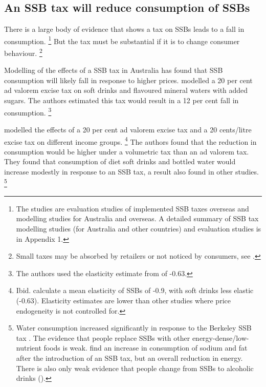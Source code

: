 \documentclass[embargoed]{grattan}
\begin{document}
\subsection{An SSB tax will reduce consumption of SSBs}\label{an-ssb-tax-will-reduce-consumption-of-ssbs}

There is a large body of evidence that shows a tax on SSBs leads to a fall in consumption.%
\footnote{The studies are evaluation studies of implemented SSB taxes overseas and modelling studies for Australia and overseas.
A detailed summary of SSB tax modelling studies (for Australia and other countries) and evaluation studies is in Appendix 1.} But the tax must be substantial if it is to change consumer behaviour.%
\footnote{Small taxes may be absorbed by retailers or not noticed by consumers, see \textcites{Thow2014systematicrevieweffectiveness}{Powell2013Assessingpotentialeffectiveness}{Mytton2012Taxingunhealthyfood}{Team2016Sugarlevyworking}{LordanShouldweput}{Organization2016FiscalPoliciesDiet}.}

Modelling of the effects of a SSB tax in Australia has found that SSB consumption will likely fall in response to higher prices. \textcite{Veerman2016ImpactTaxSugar} modelled a 20 per cent ad valorem excise tax on soft drinks and flavoured mineral waters with added sugars.
The authors estimated this tax would result in a 12 per cent fall in consumption.%
\footnote{The authors used the elasticity estimate from \textcite{Sharma2014effectstaxingsugarsweetened} of -0.63.}

\textcite{Sharma2014effectstaxingsugarsweetened} modelled the effects of a 20 per cent ad valorem excise tax and a 20 cents/litre excise tax on different income groups.%
\footnote{Ibid. calculate a mean elasticity of SSBs of -0.9, with soft drinks less elastic (-0.63).
Elasticity estimates are lower than other studies where price endogeneity is not controlled for.} The authors found that the reduction in consumption would be higher under a volumetric tax than an ad valorem tax.
They found that consumption of diet soft drinks and bottled water would increase modestly in response to an SSB tax, a result also found in other studies.%
\footnote{Water consumption increased significantly in response to the Berkeley SSB tax \textcites{Colchero2016Beveragepurchasesstores}{Briggs2013Overallincomespecific}{Falbe2015Higherretailprices}.
The evidence that people replace SSBs with other energy-dense/low-nutrient foods is weak. \textcite{Zhen2014Predictingeffectssugar} find an increase in consumption of sodium and fat after the introduction of an SSB tax, but an overall reduction in energy.
There is also only weak evidence that people change from SSBs to alcoholic drinks (\textcite{Wansink2014cokecoorsfield}).}
\end{document}
